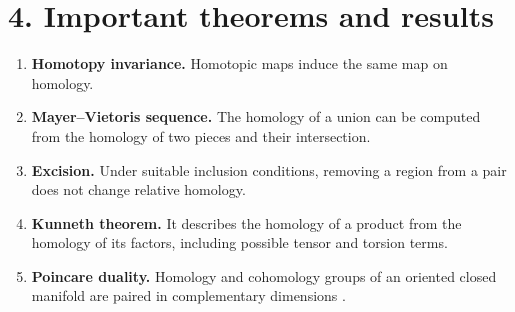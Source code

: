 \section*{4. Important theorems and results}
\begin{enumerate}[leftmargin=*,itemsep=0.35em]
\item \textbf{Homotopy invariance.} Homotopic maps induce the same map on homology.

\item \textbf{Mayer--Vietoris sequence.} The homology of a union can be computed from the homology of two pieces and their intersection.

\item \textbf{Excision.} Under suitable inclusion conditions, removing a region from a pair does not change relative homology.

\item \textbf{Kunneth theorem.} It describes the homology of a product from the homology of its factors, including possible tensor and torsion terms.

\item \textbf{Poincare duality.} Homology and cohomology groups of an oriented closed manifold are paired in complementary dimensions \cite{homology_theory_ref4}.
\end{enumerate}

